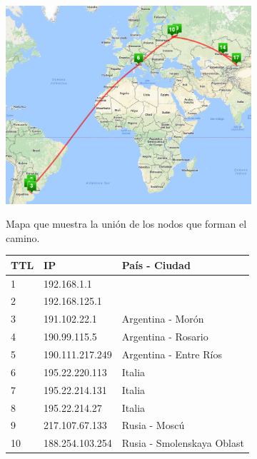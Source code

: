 \begin{figure}[ht]
  \hspace*{-0.4cm}
  \begin{subfigure}[b]{.60\textwidth}
    \includegraphics[width=\textwidth]{Imagenes/kazajistan_map.png}
    \label{fig:kazajthan_map}
    \caption{Mapa que muestra la unión de los nodos que forman el camino.}
  \end{subfigure}
  \begin{subfigure}[b]{.39\textwidth}
    \footnotesize
    \begin{tabular}{ l l l }
      \hline
      \textbf{TTL} & \textbf{IP} &  \textbf{País - Ciudad} \\ \hline
      1 & 192.168.1.1 &\\ \hline
      2 & 192.168.125.1 &\\ \hline
      3 & 191.102.22.1 & Argentina - Morón\\ \hline
      4 & 190.99.115.5 & Argentina - Rosario\\ \hline
      5 & 190.111.217.249 & Argentina - Entre Ríos\\ \hline
      6 & 195.22.220.113 & Italia\\ \hline
      \rowcolor[RGB]{196,214,255}
      7 & 195.22.214.131 & Italia\\ \hline
      8 & 195.22.214.27 & Italia\\ \hline
      \rowcolor[RGB]{196,214,255}
      9 & 217.107.67.133 & Rusia - Moscú \\ \hline
      \rowcolor[RGB]{196,214,255}
      10 & 188.254.103.254 & Rusia - Smolenskaya Oblast\\ \hline

\end{tabular}
\end{subfigure}
\end{figure}
